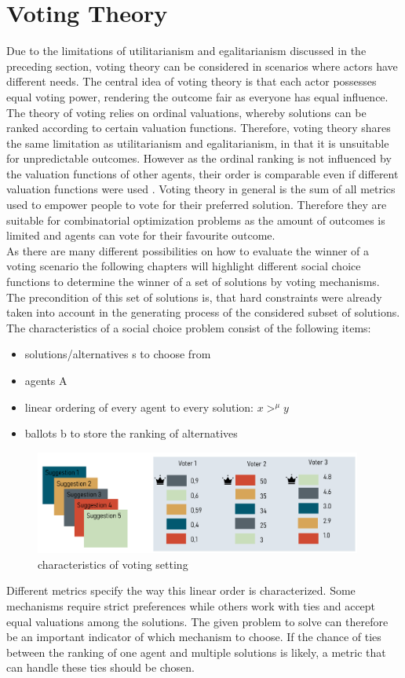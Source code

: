 \documentclass[german, a4paper, 11pt, oneside]{scrbook}
\begin{document}
\section{Voting Theory}
Due to the limitations of utilitarianism and egalitarianism discussed in the preceding section, voting theory can be considered in scenarios where actors have different needs. The central idea of voting theory is that each actor possesses equal voting power, rendering the outcome fair as everyone has equal influence. The theory of voting relies on ordinal valuations, whereby solutions can be ranked according to certain valuation functions. \cite{Bhavnani.2022b}   Therefore, voting theory shares the same limitation as utilitarianism and egalitarianism, in that it is unsuitable for unpredictable outcomes. However as the ordinal ranking is not influenced by the valuation functions of other agents, their order is comparable even if different valuation functions were used \cite{Bhavnani.2022b}. Voting theory in general is the sum of all metrics used to empower people to vote for their preferred solution. \cite{FelixBrandtVincentConitzerUlleEndrissJeromeLangandArielD.Procaccia.} Therefore they are suitable for combinatorial optimization problems as the amount of outcomes is limited and agents can vote for their favourite outcome. \\As there are many different possibilities on how to evaluate the winner of a voting scenario the following chapters will highlight different social choice functions to determine the winner of a set of solutions by voting mechanisms. The precondition of this set of solutions is, that hard constraints were already taken into account in the generating process of the considered subset of solutions.  The characteristics of a social choice problem consist of the following items: 
\begin{itemize}
  \item solutions/alternatives s to choose from
  \item agents A
  \item linear ordering of every agent to every solution:  $x>^\mu y$
  \item ballots b to store the ranking of alternatives 
\end{itemize}
\begin{figure}[h]
\centering
\includegraphics[height=3.4cm]{Voting_setting}
\caption{characteristics of voting setting}
\end{figure}
Different metrics specify the way this linear order is characterized. Some mechanisms require strict preferences while others work with ties and accept equal valuations among the solutions. The given problem to solve can therefore be an important indicator of which mechanism to choose.\cite{FelixBrandtVincentConitzerUlleEndrissJeromeLangandArielD.Procaccia.} If the chance of ties between the ranking of one agent and multiple solutions is likely, a metric that can handle these ties should be chosen.
\end{document}
